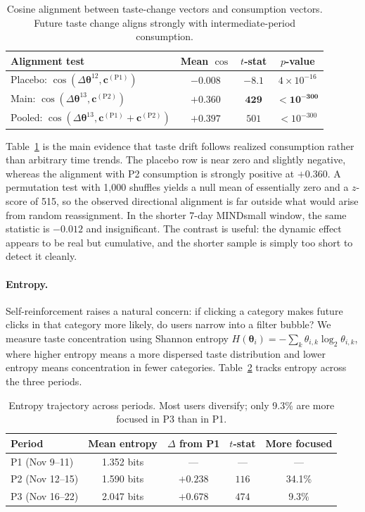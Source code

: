 \documentclass[11pt]{article}
\begin{document}
\begin{table}[ht]
\centering
\caption{Cosine alignment between taste-change vectors and consumption vectors. Future taste change aligns strongly with intermediate-period consumption.}
\label{tab:taste_alignment}
\begin{tabular}{lccc}
\toprule
Alignment test & Mean $\cos$ & $t$-stat & $p$-value \\
\midrule
Placebo: $\cos(\Delta\boldsymbol{\theta}^{12}, \mathbf{c}^{(\mathrm{P1})})$ & $-0.008$ & $-8.1$ & $4 \times 10^{-16}$ \\
Main: $\cos(\Delta\boldsymbol{\theta}^{13}, \mathbf{c}^{(\mathrm{P2})})$ & $\boldsymbol{+0.360}$ & $\boldsymbol{429}$ & $\boldsymbol{< 10^{-300}}$ \\
Pooled: $\cos(\Delta\boldsymbol{\theta}^{13}, \mathbf{c}^{(\mathrm{P1})}{+}\mathbf{c}^{(\mathrm{P2})})$ & $+0.397$ & $501$ & $< 10^{-300}$ \\
\bottomrule
\end{tabular}
\end{table}
\FloatBarrier

Table~\ref{tab:taste_alignment} is the main evidence that taste drift follows realized consumption rather than arbitrary time trends. The placebo row is near zero and slightly negative, whereas the alignment with P2 consumption is strongly positive at $+0.360$. A permutation test with 1,000 shuffles yields a null mean of essentially zero and a $z$-score of 515, so the observed directional alignment is far outside what would arise from random reassignment. In the shorter 7-day MINDsmall window, the same statistic is $-0.012$ and insignificant. The contrast is useful: the dynamic effect appears to be real but cumulative, and the shorter sample is simply too short to detect it cleanly.
\paragraph{Entropy.} Self-reinforcement raises a natural concern: if clicking a category makes future clicks in that category more likely, do users narrow into a filter bubble? We measure taste concentration using Shannon entropy $H(\boldsymbol{\theta}_i) = -\sum_k \theta_{i,k} \log_2 \theta_{i,k}$, where higher entropy means a more dispersed taste distribution and lower entropy means concentration in fewer categories. Table~\ref{tab:entropy} tracks entropy across the three periods.
\begin{table}[ht]
\centering
\caption{Entropy trajectory across periods. Most users diversify; only 9.3\% are more focused in P3 than in P1.}
\label{tab:entropy}
\begin{tabular}{lcccc}
\toprule
Period & Mean entropy & $\Delta$ from P1 & $t$-stat & More focused \\
\midrule
P1 (Nov 9--11) & 1.352 bits & --- & --- & --- \\
P2 (Nov 12--15) & 1.590 bits & $+0.238$ & $116$ & 34.1\% \\
P3 (Nov 16--22) & 2.047 bits & $+0.678$ & $474$ & 9.3\% \\
\bottomrule
\end{tabular}
\end{table}
\FloatBarrier
\end{document}

